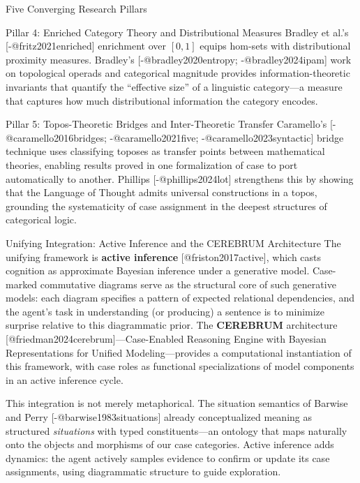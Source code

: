 \documentclass[
  ignorenonframetext,
]{beamer}
\begin{document}
\begin{frame}{Five Converging Research Pillars}
\begin{block}{Pillar 4: Enriched Category Theory and Distributional
Measures}
\protect{}\label{pillar-4-enriched-category-theory-and-distributional-measures}
Bradley et al.'s {[}-@fritz2021enriched{]} enrichment over \([0,1]\)
equips hom-sets with distributional proximity measures. Bradley's
{[}-@bradley2020entropy; -@bradley2024ipam{]} work on topological
operads and categorical magnitude provides information-theoretic
invariants that quantify the ``effective size'' of a linguistic
category---a measure that captures how much distributional information
the category encodes.
\end{block}

\begin{block}{Pillar 5: Topos-Theoretic Bridges and Inter-Theoretic
Transfer}
\protect{}\label{pillar-5-topos-theoretic-bridges-and-inter-theoretic-transfer}
Caramello's {[}-@caramello2016bridges; -@caramello2021five;
-@caramello2023syntactic{]} bridge technique uses classifying toposes as
transfer points between mathematical theories, enabling results proved
in one formalization of case to port automatically to another. Phillips
{[}-@phillips2024lot{]} strengthens this by showing that the Language of
Thought admits universal constructions in a topos, grounding the
systematicity of case assignment in the deepest structures of
categorical logic.
\end{block}
\end{frame}

\begin{frame}{Unifying Integration: Active Inference and the CEREBRUM
Architecture}
\protect{}\label{unifying-integration-active-inference-and-the-cerebrum-architecture}
The unifying framework is \textbf{active inference}
{[}@friston2017active{]}, which casts cognition as approximate Bayesian
inference under a generative model. Case-marked commutative diagrams
serve as the structural core of such generative models: each diagram
specifies a pattern of expected relational dependencies, and the agent's
task in understanding (or producing) a sentence is to minimize surprise
relative to this diagrammatic prior. The \textbf{CEREBRUM} architecture
{[}@friedman2024cerebrum{]}---Case-Enabled Reasoning Engine with
Bayesian Representations for Unified Modeling---provides a computational
instantiation of this framework, with case roles as functional
specializations of model components in an active inference cycle.

This integration is not merely metaphorical. The situation semantics of
Barwise and Perry {[}-@barwise1983situations{]} already conceptualized
meaning as structured \emph{situations} with typed constituents---an
ontology that maps naturally onto the objects and morphisms of our case
categories. Active inference adds dynamics: the agent actively samples
evidence to confirm or update its case assignments, using diagrammatic
structure to guide exploration.
\end{frame}
\end{document}
